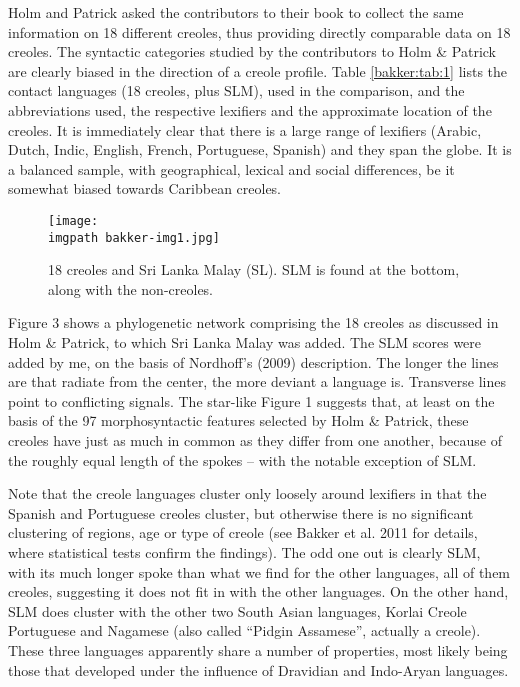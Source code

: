 Holm and Patrick asked the contributors to their book to collect the same information on 18 different creoles, thus providing directly comparable data on 18 creoles. The syntactic categories studied by the contributors to Holm \& Patrick are clearly biased in the direction of a creole profile. Table \ref{bakker:tab:1} lists the contact languages (18 creoles, plus SLM), used in the comparison, and the abbreviations used, the respective lexifiers and the approximate location of the creoles. It is immediately clear that there is a large range of lexifiers (Arabic, Dutch, Indic, English, French, Portuguese, Spanish) and they span the globe. It is a balanced sample, with geographical, lexical and social differences, be it somewhat biased towards Caribbean creoles. 

\begin{figure}

\texttt{[image: \\imgpath bakker-img1.jpg]}
 \caption[18 creoles and Sri Lanka Malay]{18 creoles and Sri Lanka Malay (SL). 
SLM is found at the bottom, along with the non-creoles.}
\label{fig:bakker3}
\end{figure}

Figure 3 shows a phylogenetic network comprising the 18 creoles as discussed in Holm \& Patrick, to which Sri Lanka Malay was added. The SLM scores were added by me, on the basis of Nordhoff's (2009) description. The longer the lines are that radiate from the center, the more deviant a language is. Transverse lines point to conflicting signals. The star-like Figure 1 suggests that, at least on the basis of the 97 morphosyntactic features selected by Holm \& Patrick, these creoles have just as much in common as they differ from one another, because of the roughly equal length of the spokes -- with the notable exception of SLM. 

Note that the creole languages cluster only loosely around lexifiers in that the Spanish and Portuguese creoles cluster, but otherwise there is no significant clustering of regions, age or type of creole (see Bakker et al. 2011 for details, where statistical tests confirm the findings). The odd one out is clearly SLM, with its much longer spoke than what we find for the other languages, all of them creoles, suggesting it does not fit in with the other languages. On the other hand, SLM does cluster with the other two South Asian languages, Korlai Creole Portuguese and Nagamese (also called ``Pidgin Assamese'', actually a creole). These three languages apparently share a number of properties, most likely being those that developed under the influence of Dravidian and Indo-Aryan languages.

